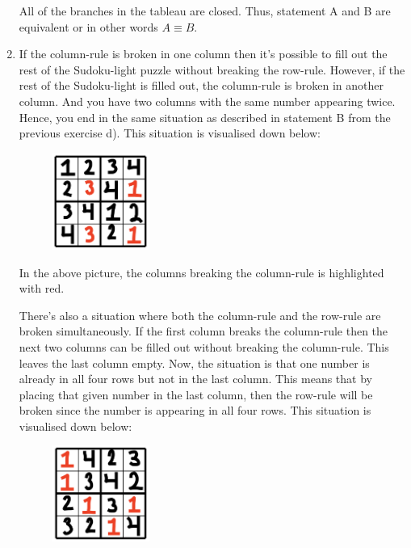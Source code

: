 \begin{enumerate}
All of the branches in the tableau are closed. Thus, statement A and B are equivalent or in other words $A \equiv B$.

\item
If the column-rule is broken in one column then it's possible to fill out the rest of the Sudoku-light puzzle without breaking the row-rule. However, if the rest of the Sudoku-light is filled out, the column-rule is broken in another column. And you have two columns with the same number appearing twice. Hence, you end in the same situation as described in statement B from the previous exercise d). This situation is visualised down below:

\begin{figure}[h]
\centering
\includegraphics[width=3.2cm]{root/e_1.png}
\end{figure}

In the above picture, the columns breaking the column-rule is highlighted with red.


There's also a situation where both the column-rule and the row-rule are broken simultaneously. If the first column breaks the column-rule then the next two columns can be filled out without breaking the column-rule. This leaves the last column empty. Now, the situation is that one number is already in all four rows but not in the last column. This means that by placing that given number in the last column, then the row-rule will be broken since the number is appearing in all four rows. This situation is visualised down below:

\begin{figure}[h]
\centering
\includegraphics[width=3.2cm]{root/e_2.png}
\end{figure}

\end{enumerate}